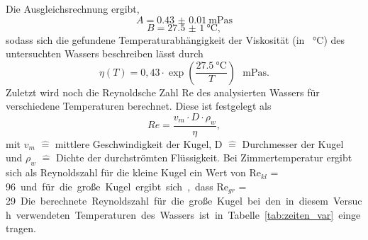 Die Ausgleichsrechnung ergibt,
\begin{equation*}
A = \SI{0.43(1)}{\milli\pascal\second}
\end{equation*}
\begin{equation*}
B = \SI{27.5(10)}{\celsius},
\end{equation*}
sodass sich die gefundene Temperaturabhängigkeit der Viskosität (in \SI{}{\celsius}) des untersuchten Wassers beschreiben lässt durch
\begin{equation*}
\eta(T) = 0,43 \cdot \exp{\left(\frac{\SI{27.5}{\celsius}}{T}\right)} \text{ }\si{\milli\pascal\second}.
\end{equation*}
%
Zuletzt wird noch die Reynoldsche Zahl Re des analysierten Wassers für verschiedene Temperaturen berechnet. Diese ist festgelegt als
\begin{equation*}
Re = \frac{v_m \cdot D \cdot \rho_{w}}{\eta},
\end{equation*}
mit $v_m$ $\hat{=}$ mittlere Geschwindigkeit der Kugel, D $\hat{=}$
Durchmesser der Kugel und $\rho_{w}$ $\hat{=}$ Dichte der durchströmten
Flüssigkeit. Bei Zimmertemperatur ergibt sich als Reynoldszahl für die
kleine Kugel ein Wert von $\text{Re}_{kl}$ = \SI{96} und für die große
Kugel ergibt sich, dass $\text{Re}_{gr}$ = \SI{29}.
Die berechnete Reynoldszahl für die große Kugel bei den in diesem Versuch verwendeten Temperaturen des Wassers ist in Tabelle \ref{tab:zeiten_var} eingetragen.
%